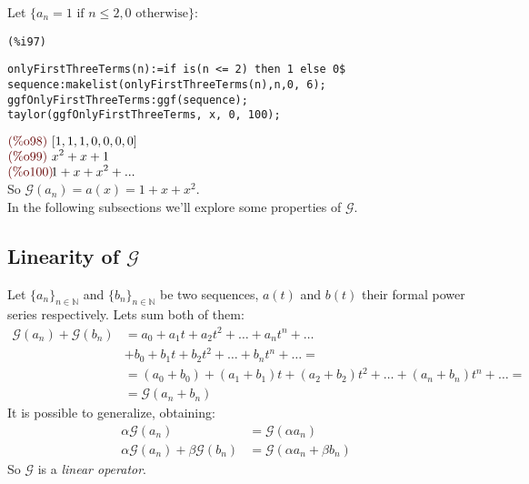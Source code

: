 Let $\{a_n = 1 \text{ if } n \leq 2,  0 \text{ otherwise}\}$:\\
\noindent
\begin{minipage}[t]{8ex}{\color{red}\bf
\begin{verbatim}
(%i97) 
\end{verbatim}}
\end{minipage}
\begin{minipage}[t]{\textwidth}{\color{blue}
\begin{verbatim}
onlyFirstThreeTerms(n):=if is(n <= 2) then 1 else 0$
sequence:makelist(onlyFirstThreeTerms(n),n,0, 6);
ggfOnlyFirstThreeTerms:ggf(sequence);
taylor(ggfOnlyFirstThreeTerms, x, 0, 100);
\end{verbatim}}
\end{minipage}
\begin{math}\displaystyle
\parbox{8ex}{\color{labelcolor}(\%o98) }
[1,1,1,0,0,0,0]
\end{math}\\
\begin{math}\displaystyle
\parbox{8ex}{\color{labelcolor}(\%o99) }
{x}^{2}+x+1
\end{math}\\
\begin{math}\displaystyle
\parbox{8ex}{\color{labelcolor}(\%o100) }
1+x+{x}^{2}+...
\end{math}\\
So $\mathcal{G}(a_n) =a(x)=1+{x}+{x}^{2}$.\\

In the following subsections we'll explore some properties of
$\mathcal{G} $.

\subsection{Linearity of $\mathcal{G} $}
Let $\{a_n\}_{n\in\mathbb{N} }$ and $\{b_n\}_{n\in\mathbb{N} } $ be
two sequences, $a(t)$ and $b(t)$ their formal power series
respectively. Lets sum both of them:
\begin{displaymath}
  \begin{split}
    \mathcal{G} (a_n)+ \mathcal{G} (b_n) &= a_0 + a_1 t
    + a_2 t^2 + \ldots + a_n t^n + \ldots \\
    &+ b_0 + b_1 t + b_2 t^2 + \ldots + b_n t^n + \ldots =\\
    &= (a_0 + b_0) + (a_1+b_1) t + (a_2 + b_2) t^2 + \ldots +
    (a_n+b_n) t^n + \ldots =\\
    &= \mathcal{G}(a_n + b_n) 
  \end{split}
\end{displaymath}
It is possible to generalize, obtaining:
\begin{displaymath}
  \begin{split}
    \alpha\mathcal{G}(a_n) &= \mathcal{G}(\alpha a_n)\\
    \alpha\mathcal{G}(a_n) +  \beta\mathcal{G}(b_n) &=
    \mathcal{G}(\alpha a_n + \beta b_n) 
  \end{split}
\end{displaymath}
So $\mathcal{G}$ is a \emph{linear operator}.

